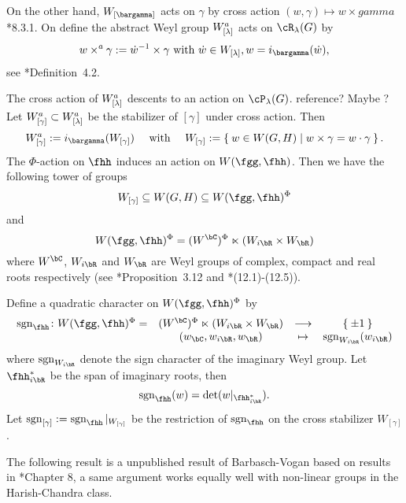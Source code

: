 \documentclass[12pt,a4paper]{amsart}
\newcommand{\sgn}{\operatorname{sgn}}
\numberwithin{equation}{section}
\theoremstyle{remark}
\newcommand{\crossa}{\times^a}
\begin{document}
On the other hand, $W_{[\bargamma]}$ acts on $\gamma$ by cross action
$(w,\gamma)\mapsto w\times gamma$ \cite{Vg}*{8.3.1}. On define the abstract Weyl
group $W^a_{[\lambda]}$ acts on $\cR_{\lambda}(G)$ by
\[
  w \crossa \gamma := \dot{w}^{-1}\times \gamma \text{ with
  } \dot{w}\in W_{[\lambda]}, w = i_{\bargamma}(\dot{w}),
\]
see \cite{V4}*{Definition~4.2}.

The cross action of $W^a_{[\lambda]}$ descents to an action on $\cP_{\lambda}(G)$.
{\color{red} reference? Maybe \cite{V4}?} Let $W^{a}_{[\gamma]}\subset W^a_{[\lambda]}$ be the stabilizer of
$[\gamma]$ under cross action. Then
\[
  \Wa_{[\gamma]}:= i_{\bargamma}(W_{[\gamma]})
  \quad \text{ with }\quad
  W_{[\gamma]}:=\Set{w\in W(G,H)| w\times \gamma = w\cdot \gamma}.
\]
The $\Phi$-action on $\fhh$ induces an action on $W(\fgg,\fhh)$. Then we have
the following tower of groups
\[
  W_{[\gamma]} \subseteq W(G,H) \subseteq W(\fgg,\fhh)^{\Phi}
\]
and
\[
  W(\fgg,\fhh)^{\Phi}=(\WC)^{\Phi}\ltimes (\WiR\times \WR)
\]
where $\WC$, $\WiR$ and $\WR$ are Weyl groups of complex, compact and real
roots respectively (see \cite{V4}*{Proposition~3.12} and
\cite{AC}*{(12.1)-(12.5)}).


Define a quadratic character on $W(\fgg,\fhh)^{\Phi}$ by
\[
  \begin{array}{rccc}
    \sgn_{\fhh}\colon  W(\fgg,\fhh)^{\Phi} =
    & (\WC)^{\Phi}\ltimes (\WiR\times \WR)
    & \longrightarrow & \Set{\pm 1}\\
    & (w_{\bC},w_{i\bR},w_{\bR}) & \mapsto & \sgn_{\WiR}(w_{i\bR})
  \end{array}
\]
where $\sgn_{\WiR}$ denote the sign character of the imaginary Weyl group. Let
$\fhhiR^{*}$ be the span of imaginary roots, then
\[
  \sgn_{\fhh}(w) = \det(w|_{\fhhiR^{*}}).
\]
Let $\sgn_{[\gamma]}:=\sgn_{\fhh}|_{W_{[\gamma]}}$ be the restriction of
$\sgn_{\fhh}$ on the cross stabilizer $W_{[\gamma]}$.

The following result is a unpublished result of Barbasch-Vogan based on results
in \cite{Vg}*{Chapter 8}, a same argument works equally well with non-linear groups
in the Harish-Chandra class.
\end{document}

